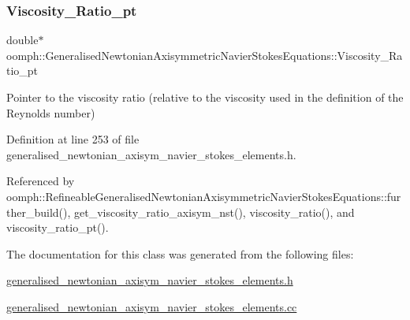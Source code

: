 \subsubsection{\texorpdfstring{Viscosity\+\_\+\+Ratio\+\_\+pt}{Viscosity\_Ratio\_pt}}
{\footnotesize\ttfamily double$\ast$ oomph\+::\+Generalised\+Newtonian\+Axisymmetric\+Navier\+Stokes\+Equations\+::\+Viscosity\+\_\+\+Ratio\+\_\+pt\hspace{0.3cm}{\ttfamily [protected]}}



Pointer to the viscosity ratio (relative to the viscosity used in the definition of the Reynolds number) 



Definition at line 253 of file generalised\+\_\+newtonian\+\_\+axisym\+\_\+navier\+\_\+stokes\+\_\+elements.\+h.



Referenced by oomph\+::\+Refineable\+Generalised\+Newtonian\+Axisymmetric\+Navier\+Stokes\+Equations\+::further\+\_\+build(), get\+\_\+viscosity\+\_\+ratio\+\_\+axisym\+\_\+nst(), viscosity\+\_\+ratio(), and viscosity\+\_\+ratio\+\_\+pt().



The documentation for this class was generated from the following files\+:\begin{DoxyCompactItemize}
\item 
\hyperlink{generalised__newtonian__axisym__navier__stokes__elements_8h}{generalised\+\_\+newtonian\+\_\+axisym\+\_\+navier\+\_\+stokes\+\_\+elements.\+h}\item 
\hyperlink{generalised__newtonian__axisym__navier__stokes__elements_8cc}{generalised\+\_\+newtonian\+\_\+axisym\+\_\+navier\+\_\+stokes\+\_\+elements.\+cc}\end{DoxyCompactItemize}
